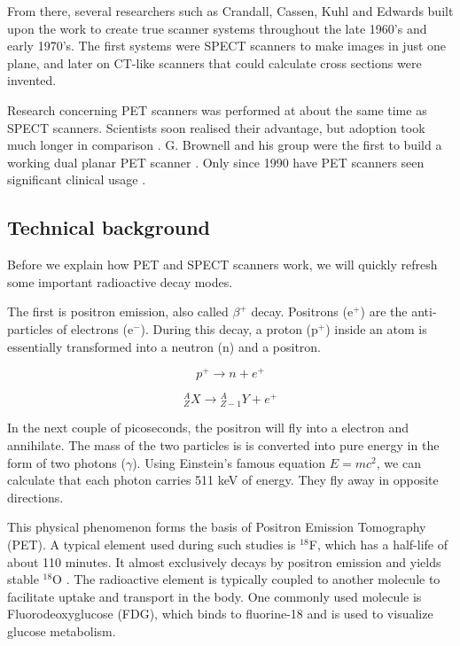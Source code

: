 From there, several researchers such as Crandall, Cassen, Kuhl and Edwards built
upon the work to create true scanner systems throughout the late 1960's and
early 1970's. The first systems were SPECT scanners to make images in just one
plane, and later on CT-like scanners that could calculate cross sections were
invented.

Research concerning PET scanners was performed at about the same time
as SPECT scanners. Scientists soon realised their advantage, but adoption took
much longer in comparison \cite{petreview}. G. Brownell and his group were the
first to build a working dual planar PET scanner \cite{brownell}. Only since
1990 have PET scanners seen significant clinical usage \cite{pethistory}.

\subsection{Technical background}
Before we explain how PET and SPECT scanners work, we will quickly refresh some
important radioactive decay modes.

The first is positron emission, also called $\beta^+$ decay. Positrons (e$^+$)
are the anti-particles of electrons (e$^-$). During this decay, a proton (p$^+$)
inside an atom is essentially transformed into a neutron (n) and a positron.

\begin{equation}
	p^+ \rightarrow n + e^+
\end{equation}

\begin{equation}
	{}_Z^AX \rightarrow {}_{Z-1}^AY + e^+
\end{equation}

In the next couple of picoseconds, the positron will fly into a electron and
annihilate. The mass of the two particles is is converted into pure energy in
the form of two photons ($\gamma$). Using Einstein's famous equation $E = mc^2$,
we can calculate that each photon carries 511 keV of energy. They fly away in
opposite directions.

This physical phenomenon forms the basis of Positron Emission Tomography (PET).
A typical element used during such studies is $^{18}$F, which has a half-life of
about 110 minutes. It almost exclusively decays by positron emission and yields
stable $^{18}$O \cite{suetens}. The radioactive element is typically coupled to
another molecule to facilitate uptake and transport in the body. One commonly
used molecule is Fluorodeoxyglucose (FDG), which binds to fluorine-18 and is
used to visualize glucose metabolism.

